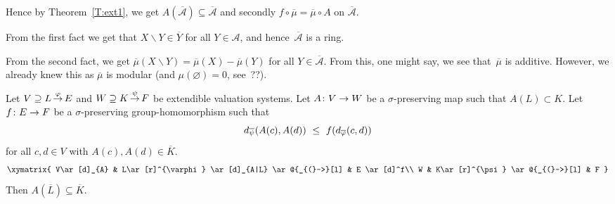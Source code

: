 \documentclass[main.tex]{subfiles}
\begin{document}
\begin{ex}
Hence by Theorem~\ref{T:ext1},
we get $A(\overline{\mathcal{A}})\subseteq \overline{\mathcal{A}}$
and secondly
  $f\circ\overline\mu=\overline \mu \circ A$ on $\overline{\mathcal{A}}$.

From the first fact
we get that $X\backslash Y \in \overline{Y}$
for all $Y\in \mathcal{A}$,
and hence~$\overline{\mathcal{A}}$ is a ring.

From the second fact,
we get $\overline\mu (X\backslash Y)
= \overline\mu(X) - \overline\mu(Y)$
for all $Y\in \overline{\mathcal{A}}$.
From this,
one might say,
we see that~$\overline\mu$ is additive.
However, we already knew this
as $\overline\mu$ is modular
(and $\mu(\varnothing)=0$, see~??).
\end{ex}
%
%
\begin{thm}
\label{T:ext2}
Let $V \supseteq L\,\smash{\stackrel{\varphi}{\rightarrow}}\,E$ and
 $W \supseteq K\,\smash{\stackrel{\psi}{\rightarrow}}\,F$ be extendible valuation systems.
Let
$A\colon V\rightarrow W$
be a $\sigma$-preserving map
such that $A(L)\subset K$.
Let $f\colon E\rightarrow F$ be a $\sigma$-preserving group-homomorphism
such that
\begin{equation}
\label{eq:T:ext2-as}
\ld{\overline{\psi}}(A(c),A(d))\ \leq\  f(\ld{\overline{\varphi}}(c,d))
\end{equation}
for all $c,d\in V$ with $A(c),A(d)\in \overline K$.
\begin{equation*}
\xymatrix{
V\ar[d]_{A} & 
  L\ar[r]^{\varphi} \ar[d]_{A|L} \ar@{_{(}->}[l] & 
  E \ar[d]^f\\
W &
  K\ar[r]^{\psi} \ar@{_{(}->}[l] & 
  F
}\end{equation*}
Then $A(\overline{L})\subseteq \overline{K}$.
\end{thm}
\end{document}
